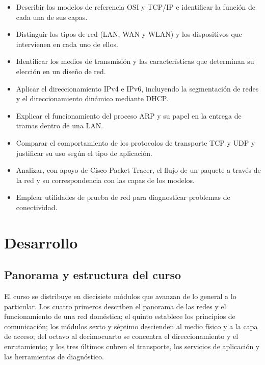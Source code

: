 \documentclass[11pt,a4paper]{article}
\begin{document}
\begin{itemize}[leftmargin=*]
  \item Describir los modelos de referencia OSI y TCP/IP e identificar la
        función de cada una de sus capas.
  \item Distinguir los tipos de red (LAN, WAN y WLAN) y los dispositivos que
        intervienen en cada uno de ellos.
  \item Identificar los medios de transmisión y las características que
        determinan su elección en un diseño de red.
  \item Aplicar el direccionamiento IPv4 e IPv6, incluyendo la segmentación
        de redes y el direccionamiento dinámico mediante DHCP.
  \item Explicar el funcionamiento del proceso ARP y su papel en la entrega
        de tramas dentro de una LAN.
  \item Comparar el comportamiento de los protocolos de transporte TCP y UDP
        y justificar su uso según el tipo de aplicación.
  \item Analizar, con apoyo de Cisco Packet Tracer, el flujo de un paquete a
        través de la red y su correspondencia con las capas de los modelos.
  \item Emplear utilidades de prueba de red para diagnosticar problemas de
        conectividad.
\end{itemize}

\section{Desarrollo}

\subsection{Panorama y estructura del curso}

El curso se distribuye en diecisiete módulos que avanzan de lo general a lo
particular. Los cuatro primeros describen el panorama de las redes y el
funcionamiento de una red doméstica; el quinto establece los principios de
comunicación; los módulos sexto y séptimo descienden al medio físico y a la
capa de acceso; del octavo al decimocuarto se concentra el direccionamiento y
el enrutamiento; y los tres últimos cubren el transporte, los servicios de
aplicación y las herramientas de diagnóstico.
\end{document}
